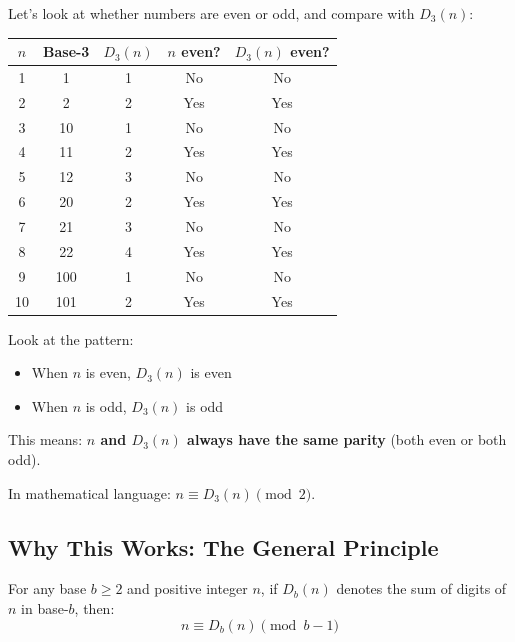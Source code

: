 Let's look at whether numbers are even or odd, and compare with $D_3(n)$:

\begin{center}
\begin{tabular}{c|c|c|c|c}
$n$ & Base-3 & $D_3(n)$ & $n$ even? & $D_3(n)$ even? \\
\hline
1 & 1 & 1 & No & No \\
2 & 2 & 2 & Yes & Yes \\
3 & 10 & 1 & No & No \\
4 & 11 & 2 & Yes & Yes \\
5 & 12 & 3 & No & No \\
6 & 20 & 2 & Yes & Yes \\
7 & 21 & 3 & No & No \\
8 & 22 & 4 & Yes & Yes \\
9 & 100 & 1 & No & No \\
10 & 101 & 2 & Yes & Yes \\
\end{tabular}
\end{center}

\begin{intuitive}
Look at the pattern:
\begin{itemize}
\item When $n$ is even, $D_3(n)$ is even
\item When $n$ is odd, $D_3(n)$ is odd
\end{itemize}

This means: \textbf{$n$ and $D_3(n)$ always have the same parity} (both even or both odd).

In mathematical language: $n \equiv D_3(n) \pmod{2}$.
\end{intuitive}

\subsection{Why This Works: The General Principle}
\label{subsec:general-principle}


\begin{theorem}
\label{thm:digital-sum-modular}
For any base $b \geq 2$ and positive integer $n$, if $D_b(n)$ denotes the sum of digits of $n$ in base-$b$, then:
\begin{equation}
n \equiv D_b(n) \pmod{b-1}
\end{equation}
\end{theorem}

